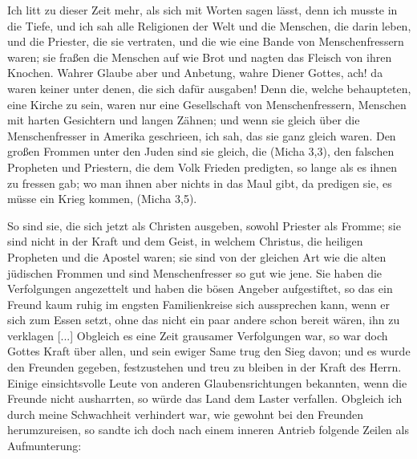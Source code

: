 Ich litt zu dieser Zeit mehr, als sich mit Worten sagen lässt,
denn ich musste in die Tiefe, und ich sah alle Religionen der Welt
und die Menschen, die darin leben, und die Priester, die sie vertraten, 
und die wie eine Bande von Menschenfressern waren; sie
fraßen die Menschen auf wie Brot und nagten das Fleisch von
ihren Knochen. Wahrer Glaube aber und Anbetung, wahre
Diener Gottes, ach! da waren keiner unter denen, die sich dafür
ausgaben! Denn die, welche behaupteten, eine Kirche zu sein,
waren nur eine Gesellschaft von Menschenfressern, Menschen mit
harten Gesichtern und langen Zähnen; und wenn sie gleich über
die Menschenfresser in Amerika geschrieen, ich sah, das sie ganz
gleich waren. Den großen Frommen unter den Juden sind sie
gleich, die  (Micha 3,3), den
falschen Propheten und Priestern, die dem Volk Frieden predigten,
so lange als es ihnen zu fressen gab; wo man ihnen aber
nichts in das Maul gibt, da predigen sie, es müsse ein Krieg
kommen,  (Micha 3,5).

So sind sie, die sich jetzt als Christen ausgeben, sowohl
Priester als Fromme; sie sind nicht in der Kraft und dem Geist,
in welchem Christus, die heiligen Propheten und die Apostel
waren; sie sind von der gleichen Art wie die alten jüdischen
Frommen und sind Menschenfresser so gut wie jene. Sie haben
die Verfolgungen angezettelt und haben die bösen Angeber 
aufgestiftet, so das ein Freund kaum ruhig im engsten Familienkreise
sich aussprechen kann, wenn er sich zum Essen setzt, ohne das
nicht ein paar andere schon bereit wären, ihn zu verklagen [...]
Obgleich es eine Zeit grausamer Verfolgungen war, so war
doch Gottes Kraft über allen, und sein ewiger Same trug den Sieg
davon; und es wurde den Freunden gegeben, festzustehen und treu
zu bleiben in der Kraft des Herrn. Einige einsichtsvolle Leute
von anderen Glaubensrichtungen bekannten, wenn die Freunde
nicht ausharrten, so würde das Land dem Laster verfallen.
Obgleich ich durch meine Schwachheit verhindert war, wie
gewohnt bei den Freunden herumzureisen, so sandte ich doch nach
einem inneren Antrieb folgende Zeilen als Aufmunterung:

